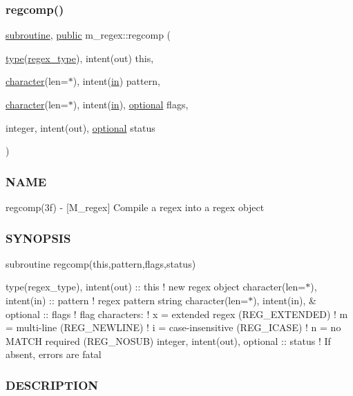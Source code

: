 \subsubsection{\texorpdfstring{regcomp()}{regcomp()}}
{\footnotesize\ttfamily \hyperlink{M__stopwatch_83_8txt_acfbcff50169d691ff02d4a123ed70482}{subroutine}, \hyperlink{M__stopwatch_83_8txt_a2f74811300c361e53b430611a7d1769f}{public} m\+\_\+regex\+::regcomp (\begin{DoxyParamCaption}\item[{\hyperlink{stop__watch_83_8txt_a70f0ead91c32e25323c03265aa302c1c}{type}(\hyperlink{structm__regex_1_1regex__type}{regex\+\_\+type}), intent(out)}]{this,  }\item[{\hyperlink{option__stopwatch_83_8txt_abd4b21fbbd175834027b5224bfe97e66}{character}(len=$\ast$), intent(\hyperlink{M__journal_83_8txt_afce72651d1eed785a2132bee863b2f38}{in})}]{pattern,  }\item[{\hyperlink{option__stopwatch_83_8txt_abd4b21fbbd175834027b5224bfe97e66}{character}(len=$\ast$), intent(\hyperlink{M__journal_83_8txt_afce72651d1eed785a2132bee863b2f38}{in}), \hyperlink{option__stopwatch_83_8txt_aa4ece75e7acf58a4843f70fe18c3ade5}{optional}}]{flags,  }\item[{integer, intent(out), \hyperlink{option__stopwatch_83_8txt_aa4ece75e7acf58a4843f70fe18c3ade5}{optional}}]{status }\end{DoxyParamCaption})}



\subsubsection*{N\+A\+ME}

regcomp(3f) -\/ \mbox{[}M\+\_\+regex\mbox{]} Compile a regex into a regex object \subsubsection*{S\+Y\+N\+O\+P\+S\+IS}

subroutine regcomp(this,pattern,flags,status)

type(regex\+\_\+type), intent(out) \+:\+: this ! new regex object character(len=$\ast$), intent(in) \+:\+: pattern ! regex pattern string character(len=$\ast$), intent(in), \& optional \+:\+: flags ! flag characters\+: ! x = extended regex (R\+E\+G\+\_\+\+E\+X\+T\+E\+N\+D\+ED) ! m = multi-\/line (R\+E\+G\+\_\+\+N\+E\+W\+L\+I\+NE) ! i = case-\/insensitive (R\+E\+G\+\_\+\+I\+C\+A\+SE) ! n = no M\+A\+T\+CH required (R\+E\+G\+\_\+\+N\+O\+S\+UB) integer, intent(out), optional \+:\+: status ! If absent, errors are fatal \subsubsection*{D\+E\+S\+C\+R\+I\+P\+T\+I\+ON}

